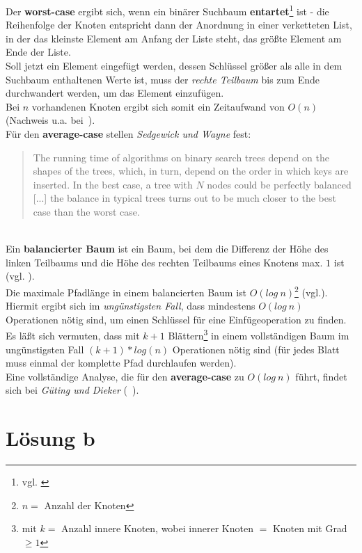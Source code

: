  \noindent
Der \textbf{worst-case} ergibt sich, wenn ein binärer Suchbaum \textbf{entartet}\footnote{
vgl. \cite[136]{GD18e}
} ist - die Reihenfolge der Knoten entspricht dann der Anordnung in einer verketteten List, in der das kleinste Element am Anfang der Liste steht, das größte Element am Ende der Liste.\\
Soll jetzt ein Element eingefügt werden, dessen Schlüssel größer als alle in dem Suchbaum enthaltenen Werte ist, muss der \textit{rechte Teilbaum} bis zum Ende durchwandert werden, um das Element einzufügen.\\
Bei $n$ vorhandenen Knoten ergibt sich somit ein Zeitaufwand von $O(n)$ (Nachweis u.a. bei~\cite[135 f.]{GD18d}).\\

\noindent
Für den \textbf{average-case} stellen \textit{Sedgewick und Wayne} fest:

\blockquote[{\cite[403]{SW11}}]{
The running time of algorithms on binary search trees depend on the shapes of the trees, which, in turn, depend on the order in which keys are inserted. In the best case, a tree with $N$ nodes could be perfectly balanced [...] the balance in typical trees turns out to be much closer to the best case than the worst case.
}\\

\noindent
Ein \textbf{balancierter Baum} ist ein Baum, bei dem die Differenz der Höhe des linken Teilbaums und die Höhe des rechten Teilbaums eines Knotens max. $1$ ist (vgl. \cite[284]{OW17e}).\\
Die maximale Pfadlänge in einem balancierten Baum ist $O(log\ n)$\footnote{$n=$ Anzahl der Knoten} (vgl.\cite[135]{GD18d}).\\
Hiermit ergibt sich im \textit{ungünstigsten Fall}, dass mindestens $O(log\ n)$ Operationen nötig sind, um einen Schlüssel für eine Einfügeoperation zu finden.\\
Es läßt sich vermuten, dass mit ${k+1}$ Blättern\footnote{mit $k=$ Anzahl innere Knoten, wobei innerer Knoten $=$ Knoten mit Grad $\geq 1$} in einem vollständigen Baum im ungünstigsten Fall $(k+1) * log(n)$ Operationen nötig sind (für jedes Blatt muss einmal der komplette Pfad durchlaufen werden).\\
Eine vollständige Analyse, die für den \textbf{average-case} zu $O(log\ n)$ führt, findet sich bei \textit{Güting und Dieker} (~\cite[136 ff.]{GD18d}).




\section{Lösung b}

